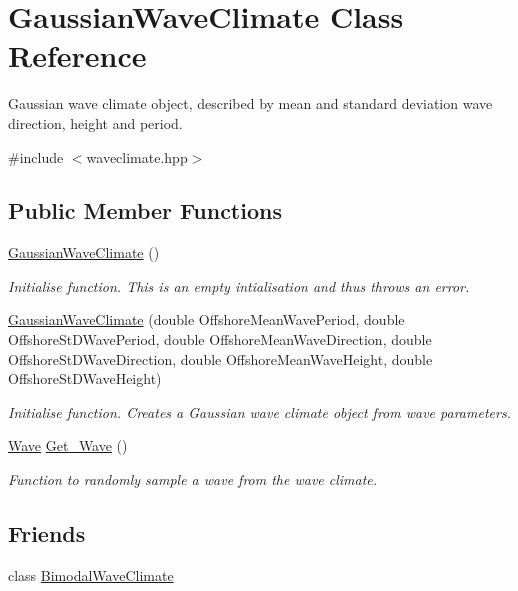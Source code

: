 \hypertarget{classGaussianWaveClimate}{\section{Gaussian\-Wave\-Climate Class Reference}
\label{classGaussianWaveClimate}
}


Gaussian wave climate object, described by mean and standard deviation wave direction, height and period.  




{\ttfamily \#include $<$waveclimate.\-hpp$>$}

\subsection*{Public Member Functions}
\begin{DoxyCompactItemize}
\item 
\hyperlink{classGaussianWaveClimate_a4c6a9b508f949e3e2ac79e5d67f35907}{Gaussian\-Wave\-Climate} ()
\begin{DoxyCompactList}\small\item\em Initialise function. This is an empty intialisation and thus throws an error. \end{DoxyCompactList}\item 
\hyperlink{classGaussianWaveClimate_a63e63aef42c6149c03b5a6cb1d5c2a51}{Gaussian\-Wave\-Climate} (double Offshore\-Mean\-Wave\-Period, double Offshore\-St\-D\-Wave\-Period, double Offshore\-Mean\-Wave\-Direction, double Offshore\-St\-D\-Wave\-Direction, double Offshore\-Mean\-Wave\-Height, double Offshore\-St\-D\-Wave\-Height)
\begin{DoxyCompactList}\small\item\em Initialise function. Creates a Gaussian wave climate object from wave parameters. \end{DoxyCompactList}\item 
\hyperlink{classWave}{Wave} \hyperlink{classGaussianWaveClimate_a587fefec68cf5b9b09deea417fd160e7}{Get\-\_\-\-Wave} ()
\begin{DoxyCompactList}\small\item\em Function to randomly sample a wave from the wave climate. \end{DoxyCompactList}\end{DoxyCompactItemize}
\subsection*{Friends}
\begin{DoxyCompactItemize}
\item 
class \hyperlink{classGaussianWaveClimate_a513765ce88faaa82611ea97165e72d19}{Bimodal\-Wave\-Climate}
\end{DoxyCompactItemize}


